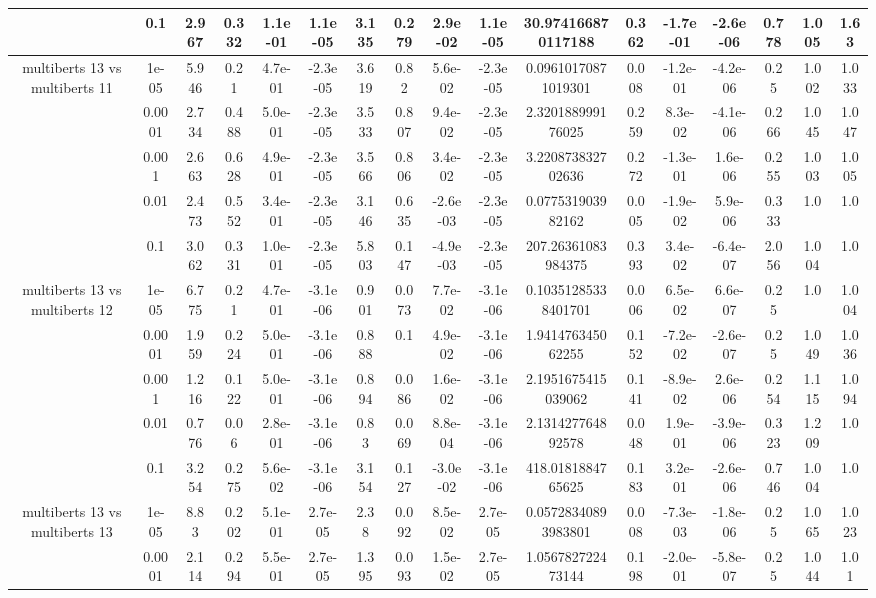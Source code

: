 \begin{tabular}{|c|c|c|c|c|c|c|c|c|c|c|c|c|c|c|c|c|}
 & 0.1 & 2.967 & 0.332 & 1.1e-01 & 1.1e-05 & 3.135 & 0.279 & 2.9e-02 & 1.1e-05 & 30.974166870117188 & 0.362 & -1.7e-01 & -2.6e-06 & 0.778 & 1.005 & 1.63 \\
\hline
\multirow{5}{*}{multiberts 13 vs multiberts 11} & 1e-05 & 5.946 & 0.21 & 4.7e-01 & -2.3e-05 & 3.619 & 0.82 & 5.6e-02 & -2.3e-05 & 0.09610170871019301 & 0.008 & -1.2e-01 & -4.2e-06 & 0.25 & 1.002 & 1.033 \\
 & 0.0001 & 2.734 & 0.488 & 5.0e-01 & -2.3e-05 & 3.533 & 0.807 & 9.4e-02 & -2.3e-05 & 2.320188999176025 & 0.259 & 8.3e-02 & -4.1e-06 & 0.266 & 1.045 & 1.047 \\
 & 0.001 & 2.663 & 0.628 & 4.9e-01 & -2.3e-05 & 3.566 & 0.806 & 3.4e-02 & -2.3e-05 & 3.220873832702636 & 0.272 & -1.3e-01 & 1.6e-06 & 0.255 & 1.003 & 1.005 \\
 & 0.01 & 2.473 & 0.552 & 3.4e-01 & -2.3e-05 & 3.146 & 0.635 & -2.6e-03 & -2.3e-05 & 0.077531903982162 & 0.005 & -1.9e-02 & 5.9e-06 & 0.333 & 1.0 & 1.0 \\
 & 0.1 & 3.062 & 0.331 & 1.0e-01 & -2.3e-05 & 5.803 & 0.147 & -4.9e-03 & -2.3e-05 & 207.26361083984375 & 0.393 & 3.4e-02 & -6.4e-07 & 2.056 & 1.004 & 1.0 \\
\hline
\multirow{5}{*}{multiberts 13 vs multiberts 12} & 1e-05 & 6.775 & 0.21 & 4.7e-01 & -3.1e-06 & 0.901 & 0.073 & 7.7e-02 & -3.1e-06 & 0.10351285338401701 & 0.006 & 6.5e-02 & 6.6e-07 & 0.25 & 1.0 & 1.004 \\
 & 0.0001 & 1.959 & 0.224 & 5.0e-01 & -3.1e-06 & 0.888 & 0.1 & 4.9e-02 & -3.1e-06 & 1.941476345062255 & 0.152 & -7.2e-02 & -2.6e-07 & 0.25 & 1.049 & 1.036 \\
 & 0.001 & 1.216 & 0.122 & 5.0e-01 & -3.1e-06 & 0.894 & 0.086 & 1.6e-02 & -3.1e-06 & 2.1951675415039062 & 0.141 & -8.9e-02 & 2.6e-06 & 0.254 & 1.115 & 1.094 \\
 & 0.01 & 0.776 & 0.06 & 2.8e-01 & -3.1e-06 & 0.83 & 0.069 & 8.8e-04 & -3.1e-06 & 2.131427764892578 & 0.048 & 1.9e-01 & -3.9e-06 & 0.323 & 1.209 & 1.0 \\
 & 0.1 & 3.254 & 0.275 & 5.6e-02 & -3.1e-06 & 3.154 & 0.127 & -3.0e-02 & -3.1e-06 & 418.0181884765625 & 0.183 & 3.2e-01 & -2.6e-06 & 0.746 & 1.004 & 1.0 \\
\hline
\multirow{5}{*}{multiberts 13 vs multiberts 13} & 1e-05 & 8.83 & 0.202 & 5.1e-01 & 2.7e-05 & 2.38 & 0.092 & 8.5e-02 & 2.7e-05 & 0.05728340893983801 & 0.008 & -7.3e-03 & -1.8e-06 & 0.25 & 1.065 & 1.023 \\
 & 0.0001 & 2.114 & 0.294 & 5.5e-01 & 2.7e-05 & 1.395 & 0.093 & 1.5e-02 & 2.7e-05 & 1.056782722473144 & 0.198 & -2.0e-01 & -5.8e-07 & 0.25 & 1.044 & 1.01 \\

\end{tabular}
